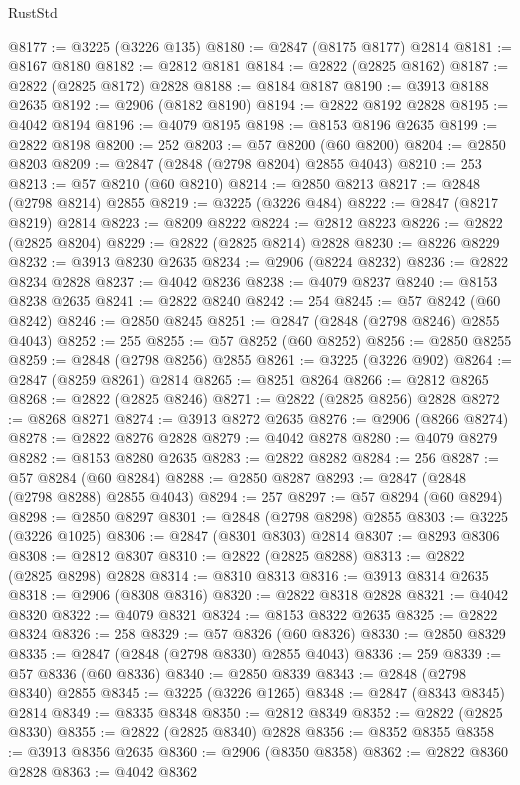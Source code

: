 \begin{lexlean}{RustStd}
\begin{coremodule}
@8177 := @3225 (@3226 @135)
@8180 := @2847 (@8175 @8177) @2814
@8181 := @8167 @8180
@8182 := @2812 @8181
@8184 := @2822 (@2825 @8162)
@8187 := @2822 (@2825 @8172) @2828
@8188 := @8184 @8187
@8190 := @3913 @8188 @2635
@8192 := @2906 (@8182 @8190)
@8194 := @2822 @8192 @2828
@8195 := @4042 @8194
@8196 := @4079 @8195
@8198 := @8153 @8196 @2635
@8199 := @2822 @8198
@8200 := 252
@8203 := @57 @8200 (@60 @8200)
@8204 := @2850 @8203
@8209 := @2847 (@2848 (@2798 @8204) @2855 @4043)
@8210 := 253
@8213 := @57 @8210 (@60 @8210)
@8214 := @2850 @8213
@8217 := @2848 (@2798 @8214) @2855
@8219 := @3225 (@3226 @484)
@8222 := @2847 (@8217 @8219) @2814
@8223 := @8209 @8222
@8224 := @2812 @8223
@8226 := @2822 (@2825 @8204)
@8229 := @2822 (@2825 @8214) @2828
@8230 := @8226 @8229
@8232 := @3913 @8230 @2635
@8234 := @2906 (@8224 @8232)
@8236 := @2822 @8234 @2828
@8237 := @4042 @8236
@8238 := @4079 @8237
@8240 := @8153 @8238 @2635
@8241 := @2822 @8240
@8242 := 254
@8245 := @57 @8242 (@60 @8242)
@8246 := @2850 @8245
@8251 := @2847 (@2848 (@2798 @8246) @2855 @4043)
@8252 := 255
@8255 := @57 @8252 (@60 @8252)
@8256 := @2850 @8255
@8259 := @2848 (@2798 @8256) @2855
@8261 := @3225 (@3226 @902)
@8264 := @2847 (@8259 @8261) @2814
@8265 := @8251 @8264
@8266 := @2812 @8265
@8268 := @2822 (@2825 @8246)
@8271 := @2822 (@2825 @8256) @2828
@8272 := @8268 @8271
@8274 := @3913 @8272 @2635
@8276 := @2906 (@8266 @8274)
@8278 := @2822 @8276 @2828
@8279 := @4042 @8278
@8280 := @4079 @8279
@8282 := @8153 @8280 @2635
@8283 := @2822 @8282
@8284 := 256
@8287 := @57 @8284 (@60 @8284)
@8288 := @2850 @8287
@8293 := @2847 (@2848 (@2798 @8288) @2855 @4043)
@8294 := 257
@8297 := @57 @8294 (@60 @8294)
@8298 := @2850 @8297
@8301 := @2848 (@2798 @8298) @2855
@8303 := @3225 (@3226 @1025)
@8306 := @2847 (@8301 @8303) @2814
@8307 := @8293 @8306
@8308 := @2812 @8307
@8310 := @2822 (@2825 @8288)
@8313 := @2822 (@2825 @8298) @2828
@8314 := @8310 @8313
@8316 := @3913 @8314 @2635
@8318 := @2906 (@8308 @8316)
@8320 := @2822 @8318 @2828
@8321 := @4042 @8320
@8322 := @4079 @8321
@8324 := @8153 @8322 @2635
@8325 := @2822 @8324
@8326 := 258
@8329 := @57 @8326 (@60 @8326)
@8330 := @2850 @8329
@8335 := @2847 (@2848 (@2798 @8330) @2855 @4043)
@8336 := 259
@8339 := @57 @8336 (@60 @8336)
@8340 := @2850 @8339
@8343 := @2848 (@2798 @8340) @2855
@8345 := @3225 (@3226 @1265)
@8348 := @2847 (@8343 @8345) @2814
@8349 := @8335 @8348
@8350 := @2812 @8349
@8352 := @2822 (@2825 @8330)
@8355 := @2822 (@2825 @8340) @2828
@8356 := @8352 @8355
@8358 := @3913 @8356 @2635
@8360 := @2906 (@8350 @8358)
@8362 := @2822 @8360 @2828
@8363 := @4042 @8362

\end{coremodule}
\end{lexlean}
